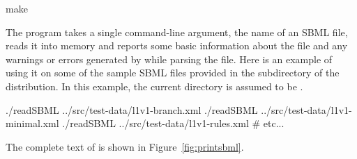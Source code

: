 \documentclass{sbmlmanual}
\begin{document}
\begin{shellVerbatim}
  make
\end{shellVerbatim}

The  program takes a single command-line argument, the name
of an SBML file, reads it into memory and reports some basic information
about the file and any warnings or errors generated by \libsbml{} while
parsing the file.  Here is an example of using it on some of the sample
SBML files provided in the  subdirectory of the
\libsbml{} distribution.  In this example, the current directory is assumed
to be .

\begin{shellVerbatim}
  ./readSBML ../src/test-data/l1v1-branch.xml
  ./readSBML ../src/test-data/l1v1-minimal.xml
  ./readSBML ../src/test-data/l1v1-rules.xml
  # etc...
\end{shellVerbatim}


The complete text of  is shown in Figure~\vref{fig:printsbml}.
\end{document}
